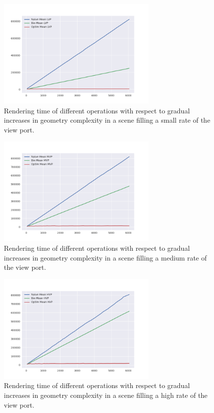 \documentclass[a4paper,11pt,oneside]{article}
\begin{document}
\begin{figure}[H]
	\centering
	\includegraphics[width=0.7\textwidth]{section5/plots/geo_complexity_lvp.png}
	\caption{Rendering time of different operations with respect to gradual increases in geometry complexity in a scene filling a small rate of the view port.}
	\label{sec5.1:geo_complexity_lvp}
\end{figure}

\begin{figure}[H]
	\centering
	\includegraphics[width=0.7\textwidth]{section5/plots/geo_complexity_mvp.png}
	\caption{Rendering time of different operations with respect to gradual increases in geometry complexity in a scene filling a medium rate of the view port.}
	\label{sec5.1:geo_complexity_mvp}
\end{figure}

\begin{figure}[H]
	\centering
	\includegraphics[width=0.7\textwidth]{section5/plots/geo_complexity_hvp.png}
	\caption{Rendering time of different operations with respect to gradual increases in geometry complexity in a scene filling a high rate of the view port.}
	\label{sec5.1:geo_complexity_hvp}
\end{figure}
\end{document}

